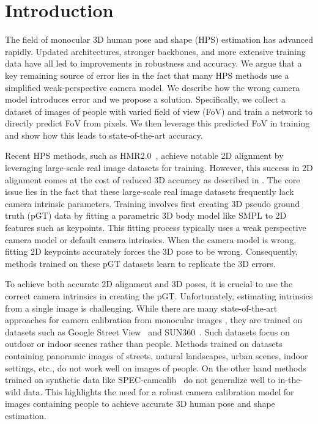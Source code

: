 \section{Introduction}
The field of monocular 3D human pose and shape (HPS) estimation has advanced rapidly. 
Updated architectures, stronger backbones, and more extensive training data have all led to improvements in robustness and accuracy.
We argue that a key remaining source of error lies in the fact that many HPS methods use a simplified weak-perspective camera model.
We describe how the wrong camera model introduces error and we propose a solution.
Specifically, we collect a dataset of images of people with varied field of view (FoV) and train a network to directly predict FoV from pixels.
We then leverage this predicted FoV in training and show how this leads to state-of-the-art accuracy.

Recent HPS methods, such as HMR2.0~\cite{hmr2}, achieve notable 2D alignment by leveraging large-scale real image datasets for training. However, this success in 2D alignment comes at the cost of reduced 3D accuracy as described in \cite{tokenhmr}. 
The core issue lies in the fact that these large-scale real image datasets frequently lack camera intrinsic parameters. 
Training involves first creating 3D pseudo ground truth (pGT) data by fitting a parametric 3D body model like SMPL \cite{smpl} to 2D features such as keypoints.
This fitting process typically uses a weak perspective camera model or default camera intrinsics.
When the camera model is wrong, fitting 2D keypoints accurately forces the 3D pose to be wrong.
Consequently, methods trained on these pGT datasets learn to replicate the 3D errors. 

To achieve both accurate 2D alignment and  3D poses, it is crucial to use the correct camera intrinsics in creating the pGT. 
Unfortunately, estimating intrinsics from a single image is challenging.
While there are many state-of-the-art approaches for camera calibration from monocular images \cite{ctrlc, perspectivefields, wildcamera}, they are trained on datasets such as Google Street View~\cite{gsv} and SUN360~\cite{sun360}.
Such datasets focus on outdoor or indoor scenes rather than people. 
Methods trained on datasets containing panoramic images of streets, natural landscapes, urban scenes, indoor settings, etc., do not work well on images of people.  
On the other hand methods trained on synthetic data like SPEC-camcalib~\cite{Kocabas_SPEC_2021} do not generalize  well to in-the-wild data. This highlights the need for a robust camera calibration model for images containing people to achieve accurate 3D human pose and shape estimation.

